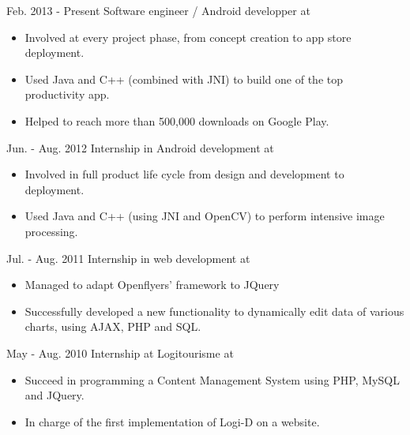 \cventry
{Feb. 2013 - Present}
{Software engineer / Android developper }
{at }
{}
{}
{
	\begin{itemize}
		\item Involved at every project phase, from concept creation to app store deployment.
		\item Used Java and C++ (combined with JNI) to build one of the top productivity app.
		\item Helped to reach more than 500,000 downloads on Google Play.
	\end{itemize}
}

\cventry
{Jun. - Aug. 2012}
{Internship in Android development}
{at }
{}
{}
{
	\begin{itemize}
		\item Involved in full product life cycle from design and development to deployment.
		\item Used Java and C++ (using JNI and OpenCV) to perform intensive image processing.
	\end{itemize}
}

\cventry
{Jul. - Aug. 2011}
{Internship in web development}
{at }
{}
{}
{
	\begin{itemize}
		\item Managed to adapt Openflyers' framework to JQuery
		\item Successfully developed a new functionality to dynamically edit data of various charts, using AJAX, PHP and SQL.
	\end{itemize}
}

\cventry
{May - Aug. 2010}
{Internship at Logitourisme}
{at }
{}
{}
{
	\begin{itemize}
		\item Succeed in programming a Content Management System using PHP, MySQL and JQuery.
		\item In charge of the first implementation of Logi-D on a website. 
	\end{itemize}
}